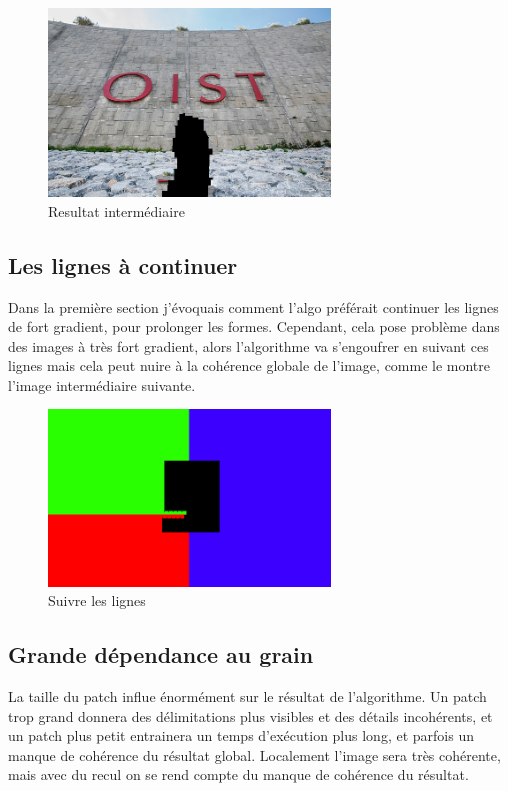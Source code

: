 \begin{figure}[ht]
\centering
\includegraphics[width=7.5cm]{img/examples/inter.jpg}
\caption{Resultat intermédiaire}
\end{figure}

\subsection{Les lignes à continuer}
Dans la première section j'évoquais comment l'algo préférait continuer les lignes de fort
gradient, pour prolonger les formes. Cependant, cela pose problème dans des images
à très fort gradient, alors l'algorithme va s'engoufrer en suivant ces lignes mais cela
peut nuire à la cohérence globale de l'image, comme le montre l'image intermédiaire suivante.

\begin{figure}[ht]
\centering
\includegraphics[width=7.5cm]{img/examples/line.jpg}
\caption{Suivre les lignes}
\end{figure}

\subsection{Grande dépendance au grain}
La taille du patch influe énormément sur le résultat de l'algorithme. Un patch trop grand
donnera des délimitations plus visibles et des détails incohérents, et un patch plus 
petit entrainera un temps d'exécution plus long, et parfois un manque de cohérence du 
résultat global. Localement l'image sera très cohérente, mais avec du recul on se rend 
compte du manque de cohérence du résultat.

